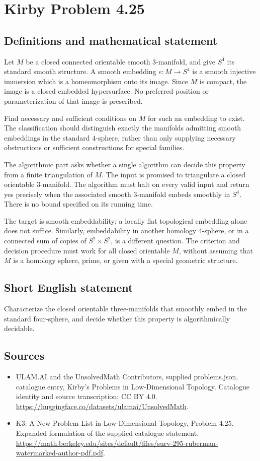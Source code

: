 \documentclass[11pt,a4paper]{article}
\begin{document}
\section*{Kirby Problem 4.25}\label{statement}

\subsection{Definitions and mathematical statement}
Let $M$ be a closed connected orientable smooth $3$-manifold, and give
$S^4$ its standard smooth structure. A smooth embedding $e:M\to S^4$
is a smooth injective immersion which is a homeomorphism onto its
image. Since $M$ is compact, the image is a closed embedded
hypersurface. No preferred position or parameterization of that image
is prescribed.

Find necessary and sufficient conditions on $M$ for such an embedding
to exist. The classification should distinguish exactly the manifolds
admitting smooth embeddings in the standard $4$-sphere, rather than
only supplying necessary obstructions or sufficient constructions for
special families.

The algorithmic part asks whether a single algorithm can decide this
property from a finite triangulation of $M$. The input is promised
to triangulate a closed orientable $3$-manifold. The algorithm must
halt on every valid input and return yes precisely when the associated
smooth $3$-manifold embeds smoothly in $S^4$. There is no bound
specified on its running time.

The target is smooth embeddability; a locally flat topological embedding
alone does not suffice. Similarly, embeddability in another homology
$4$-sphere, or in a connected sum of copies of $S^2\times S^2$,
is a different question. The criterion and decision procedure must
work for all closed orientable $M$, without assuming that $M$ is a
homology sphere, prime, or given with a special geometric structure.
\subsection{Short English statement}
Characterize the closed orientable three-manifolds that smoothly embed in the standard four-sphere, and decide whether this property is algorithmically decidable.
\subsection{Sources}
\begin{itemize}
\item[S1] ULAM.AI and the UnsolvedMath Contributors, supplied problems.json, catalogue entry, Kirby's Problems in Low-Dimensional Topology. Catalogue identity and source transcription; CC BY 4.0.
\url{https://huggingface.co/datasets/ulamai/UnsolvedMath}.
\item[S2] K3: A New Problem List in Low-Dimensional Topology, Problem 4.25. Expanded formulation of the supplied catalogue statement.
\url{https://math.berkeley.edu/sites/default/files/surv-295-ruberman-watermarked-author-pdf.pdf}.
\end{itemize}
\end{document}
